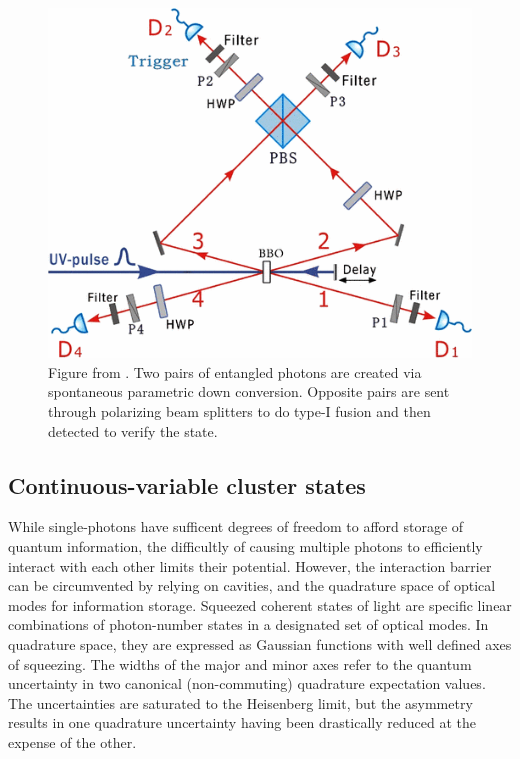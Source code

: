 \documentclass[twocolumn]{Styles/IEEEtran11}
\begin{document}
 \begin{figure}[h]
    \centering
     \includegraphics[width=\linewidth]{Images/experiment.png}
     \caption{Figure from \protect\cite{zhang2006experimental}. Two pairs of entangled photons are created via spontaneous parametric down conversion. Opposite pairs are sent through polarizing beam splitters to do type-I fusion and then detected to verify the state.}
   \end{figure}


\subsection{Continuous-variable cluster states}

While single-photons have sufficent degrees of freedom to afford storage of quantum information, the difficultly of causing multiple photons to efficiently interact with each other limits their potential. However, the interaction barrier can be circumvented by relying on cavities, and the quadrature space of optical modes for information storage. Squeezed coherent states of light \cite{lvovsky2014} are specific linear combinations of photon-number states in a designated set of optical modes. In quadrature space, they are expressed as Gaussian functions with well defined axes of squeezing. The widths of the major and minor axes refer to the quantum uncertainty in two canonical (non-commuting) quadrature expectation values. The uncertainties are saturated to the Heisenberg limit, but the asymmetry results in one quadrature uncertainty having been drastically reduced at the expense of the other.
\end{document}
